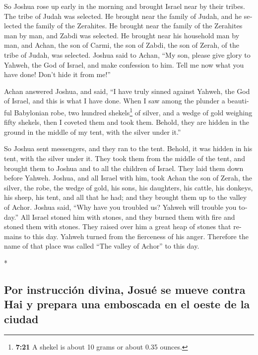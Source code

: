 \begin{paracol}{2}
\begin{otherlanguage}{english}
 So Joshua rose up early in the morning and brought
Israel near by their tribes. The tribe of Judah was selected.
 He brought near the family of Judah, and he selected the
family of the Zerahites. He brought near the family of the Zerahites man
by man, and Zabdi was selected.  He brought near his
household man by man, and Achan, the son of Carmi, the son of Zabdi, the
son of Zerah, of the tribe of Judah, was selected. 
Joshua said to Achan, ``My son, please give glory to Yahweh, the God of
Israel, and make confession to him. Tell me now what you have done!
Don't hide it from me!''

 Achan answered Joshua, and said, ``I have truly sinned
against Yahweh, the God of Israel, and this is what I have done.
 When I saw among the plunder a beautiful Babylonian
robe, two hundred shekels\footnote{\textbf{7:21} A shekel is about 10
  grams or about 0.35 ounces.} of silver, and a wedge of gold weighing
fifty shekels, then I coveted them and took them. Behold, they are
hidden in the ground in the middle of my tent, with the silver under
it.''

 So Joshua sent messengers, and they ran to the tent.
Behold, it was hidden in his tent, with the silver under it.
 They took them from the middle of the tent, and brought
them to Joshua and to all the children of Israel. They laid them down
before Yahweh.  Joshua, and all Israel with him, took
Achan the son of Zerah, the silver, the robe, the wedge of gold, his
sons, his daughters, his cattle, his donkeys, his sheep, his tent, and
all that he had; and they brought them up to the valley of Achor.
 Joshua said, ``Why have you troubled us? Yahweh will
trouble you today.'' All Israel stoned him with stones, and they burned
them with fire and stoned them with stones.  They raised
over him a great heap of stones that remains to this day. Yahweh turned
from the fierceness of his anger. Therefore the name of that place was
called ``The valley of Achor'' to this day.

\end{otherlanguage}

\switchcolumn[0]*

\hypertarget{por-instrucciuxf3n-divina-josuuxe9-se-mueve-contra-hai-y-prepara-una-emboscada-en-el-oeste-de-la-ciudad}{%
\subsection{Por instrucción divina, Josué se mueve contra Hai y prepara
una emboscada en el oeste de la
ciudad}\label{por-instrucciuxf3n-divina-josuuxe9-se-mueve-contra-hai-y-prepara-una-emboscada-en-el-oeste-de-la-ciudad}}


\end{paracol}
